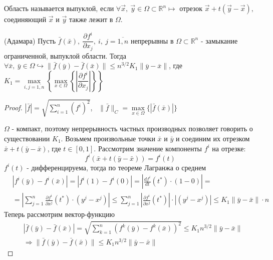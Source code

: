 \begin{definition}
Область называется выпуклой, если $\forall \vec{x},~ \vec{y} \in \Omega \subset \mathbb{R}^n \mapsto$ отрезок $\vec{x} + t(\vec{y} - \vec{x}), $ соединяющий $\vec{x}$ и $\vec{y}$ также лежит в $\Omega$.
\end{definition}

\begin{lemma} (Адамара)
	Пусть $\bar{f}(\bar{x}),~ \dfrac{\partial f^i}{\partial x_j},~ i,~j = \overline{1, n}$ непрерывны в $\Omega \subset \mathbb{R}^n $ - замыкание ограниченной, выпуклой области. Тогда $\forall \bar{x},~\bar{y} \in \Omega  \hookrightarrow \| \bar{f}(\bar{y}) - \bar{f}(\bar{x}) \| \le n^{3/2}K_1\|\overline{y} - \overline{x}\|$, где $K_1 = \max\limits_{i,j=\overline{1,n}} \left\{\max\limits_{x\in\Omega}\left\{\left|\dfrac{\partial f^i}{\partial x_j}\right|\right\} \right\}$
\end{lemma}

\begin{proof}
	
	$|\bar{f}| = \sqrt{\sum\limits_{i=1}^n (f^i)^2}$,~ $\|\bar{f}\|_C = \max\limits_{x \in \Omega}\{|\bar{f}(\bar{x})|\}$
	
	$\Omega$ - компакт, поэтому непрерывность частных производных позволяет говорить о существовании $K_1$. Возьмем произвольные точки $\bar{x}$ и $\bar{y}$ и соединим их отрезком $\bar{x} + t(\bar{y} - \bar{x})$, где $t\in[0, 1]$. Рассмотрим значение компоненты $f^i$ на отрезке:
	\[
		f^i(\bar{x} + t(\bar{y} - \bar{x})) = f^i(t)
	\]
	$f^i(t)$ - дифференцируема, тогда по теореме Лагранжа о среднем
	\begin{align*}
		&|f^i(\bar{y}) - f^i(\bar{x})| = |f^i(1) - f^i(0)| = \left| \frac{df^i}{dt}(t^*)\cdot(1-0)\right| = \\
		&= \left|\sum\limits_{j=1}^n\frac{\partial f^i}{\partial x^j}(t^*)\cdot(y^j - x^j)\right| \le \sum\limits_{j=1}^n\left|\frac{\partial f^i}{\partial x^j}(t^*)\right|\cdot\left|(y^j - x^j)\right| \le K_1\|\bar{y}-\bar{x}\|\cdot n
	\end{align*}
	Теперь рассмотрим вектор-функцию
	\begin{align*}
		&|\bar{f}(\bar{y}) - \bar{f}(\bar{x})| = \sqrt{\sum\limits_{k=1}^n (f^k(\bar{y}) - f^k(\bar{x}))^2} \le K_1n^{3/2}\|\bar{y}-\bar{x}\| \\
		&\Rightarrow \|\bar{f}(\bar{y}) - \bar{f}(\bar{x})\| \le K_1n^{3/2}\|\bar{y}-\bar{x}\|
	\end{align*}
\end{proof}

